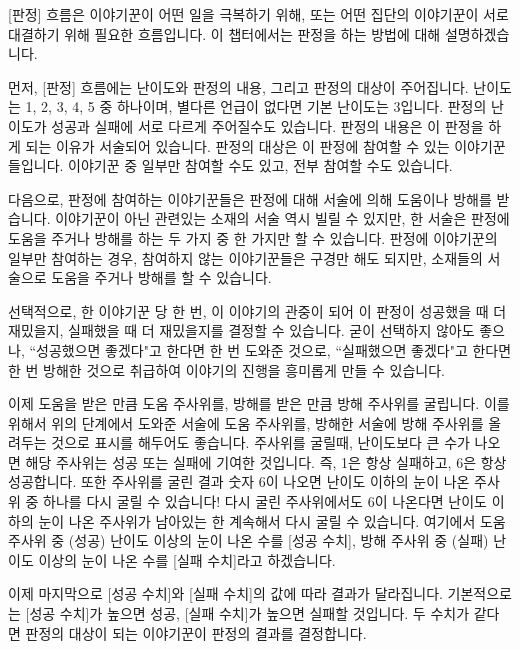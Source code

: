 \documentclass{report}
\begin{document}
	[판정] 흐름은 이야기꾼이 어떤 일을 극복하기 위해, 또는 어떤 집단의 이야기꾼이 서로 대결하기 위해 필요한 흐름입니다. 이 챕터에서는 판정을 하는 방법에 대해 설명하겠습니다.
	
	먼저, [판정] 흐름에는 난이도와 판정의 내용, 그리고 판정의 대상이 주어집니다. 난이도는 1, 2, 3, 4, 5 중 하나이며, 별다른 언급이 없다면 기본 난이도는 3입니다. 판정의 난이도가 성공과 실패에 서로 다르게 주어질수도 있습니다. 판정의 내용은 이 판정을 하게 되는 이유가 서술되어 있습니다. 판정의 대상은 이 판정에 참여할 수 있는 이야기꾼들입니다. 이야기꾼 중 일부만 참여할 수도 있고, 전부 참여할 수도 있습니다.
	
	다음으로, 판정에 참여하는 이야기꾼들은 판정에 대해 서술에 의해 도움이나 방해를 받습니다. 이야기꾼이 아닌 관련있는 소재의 서술 역시 빌릴 수 있지만, 한 서술은 판정에 도움을 주거나 방해를 하는 두 가지 중 한 가지만 할 수 있습니다. 판정에 이야기꾼의 일부만 참여하는 경우, 참여하지 않는 이야기꾼들은 구경만 해도 되지만, 소재들의 서술으로 도움을 주거나 방해를 할 수 있습니다.
	
	선택적으로, 한 이야기꾼 당 한 번, 이 이야기의 관중이 되어 이 판정이 성공했을 때 더 재밌을지, 실패했을 때 더 재밌을지를 결정할 수 있습니다. 굳이 선택하지 않아도 좋으나, ``성공했으면 좋겠다"고 한다면 한 번 도와준 것으로, ``실패했으면 좋겠다"고 한다면 한 번 방해한 것으로 취급하여 이야기의 진행을 흥미롭게 만들 수 있습니다.
	
	이제 도움을 받은 만큼 도움 주사위를, 방해를 받은 만큼 방해 주사위를 굴립니다. 이를 위해서 위의 단계에서 도와준 서술에 도움 주사위를, 방해한 서술에 방해 주사위를 올려두는 것으로 표시를 해두어도 좋습니다. 주사위를 굴릴때, 난이도보다 큰 수가 나오면 해당 주사위는 성공 또는 실패에 기여한 것입니다. 즉, 1은 항상 실패하고, 6은 항상 성공합니다. 또한 주사위를 굴린 결과 숫자 6이 나오면 난이도 이하의 눈이 나온 주사위 중 하나를 다시 굴릴 수 있습니다! 다시 굴린 주사위에서도 6이 나온다면 난이도 이하의 눈이 나온 주사위가 남아있는 한 계속해서 다시 굴릴 수 있습니다. 여기에서 도움 주사위 중 (성공) 난이도 이상의 눈이 나온 수를 [성공 수치], 방해 주사위 중 (실패) 난이도 이상의 눈이 나온 수를 [실패 수치]라고 하겠습니다.
	
	이제 마지막으로 [성공 수치]와 [실패 수치]의 값에 따라 결과가 달라집니다. 기본적으로는 [성공 수치]가 높으면 성공, [실패 수치]가 높으면 실패할 것입니다. 두 수치가 같다면 판정의 대상이 되는 이야기꾼이 판정의 결과를 결정합니다.
\end{document}
